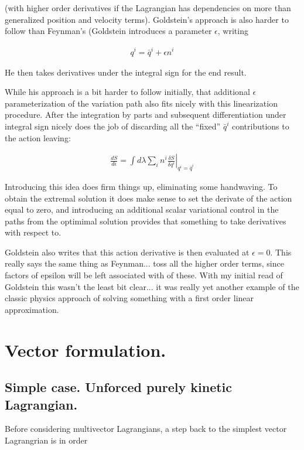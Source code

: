 \documentclass{article}
\newcommand{\qbar}[0]{\bar{q}}
\begin{document}
(with higher order derivatives if the Lagrangian has dependencies on more than generalized position and velocity terms).  Goldstein's 
approach is also harder to follow than Feynman's (Goldstein introduces a parameter $\epsilon$, writing

\begin{align}\label{eqn:epsilonvariation}
q^i = \qbar^i + \epsilon n^i
\end{align}

He then takes derivatives under the integral sign for the end result.

While his approach is a bit harder to follow initially, that additional $\epsilon$ parameterization of the variation path also fits nicely with this
linearization procedure.
After the integration by parts and subsequent differentiation under integral sign nicely does the job of
discarding all the ``fixed'' $\qbar^i$ contributions to the action leaving:

\begin{align*}
\frac{dS}{d\epsilon} = \int d\lambda \sum_i n^i \left. \frac{\delta S}{\delta q^i} \right\vert_{q^i = \qbar^i}
\end{align*}

Introducing this idea does firm things up, eliminating some handwaving.  To obtain the extremal solution it does
make sense to set the derivate of the action equal to zero, and introducing an additional scalar variational control
in the paths from the optimimal solution provides that something to take derivatives with respect to.

Goldstein also writes that this action derivative is then evaluated at $\epsilon = 0$.  This really says the same
thing as Feynman... toss all the higher order terms, since factors of epsilon will be left associated with of these.
With my initial read of Goldstein this wasn't the least bit clear... it was really yet another example of the classic
physics approach of solving something with a first order linear approximation.

\section{ Vector formulation. }

\subsection{ Simple case.  Unforced purely kinetic Lagrangian. }

Before considering multivector Lagrangians, a step back to the simplest vector Lagrangrian is in order
\end{document}
